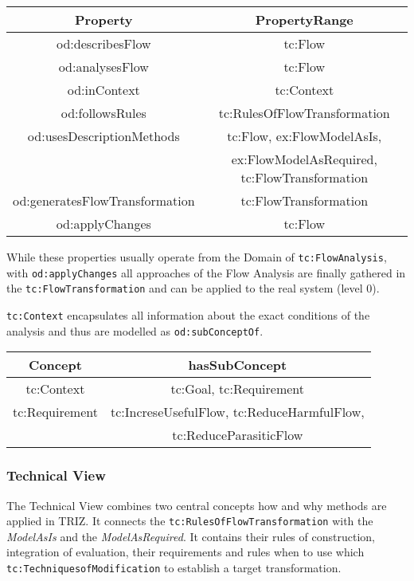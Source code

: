 \documentclass[a4paper,11pt]{article}
\begin{document}
    \begin{center}
        \begin{tabular}{|c|c|}\hline
            Property & PropertyRange \\\hline
            od:describesFlow & tc:Flow \\
            od:analysesFlow & tc:Flow \\
            od:inContext & tc:Context \\
            od:followsRules & tc:RulesOfFlowTransformation \\
            od:usesDescriptionMethods & tc:Flow, ex:FlowModelAsIs, \\
            & ex:FlowModelAsRequired, tc:FlowTransformation \\
            od:generatesFlowTransformation & tc:FlowTransformation \\
            od:applyChanges & tc:Flow \\\hline 
        \end{tabular}
        \end{center}
    
    While these properties usually operate from the Domain of 
    \texttt{tc:FlowAnalysis}, with \newline
    \texttt{od:applyChanges} all approaches of the Flow Analysis are finally
    gathered in the \newline \texttt{tc:FlowTransformation} and can be applied 
    to the real system (level 0).

    \texttt{tc:Context} encapsulates all information about the exact conditions
    of the analysis and \newline thus are modelled as \texttt{od:subConceptOf}.

    \begin{center}
        \begin{tabular}{|c|c|}\hline
            Concept & hasSubConcept \\\hline
            tc:Context & tc:Goal, tc:Requirement \\
            tc:Requirement & tc:IncreseUsefulFlow, tc:ReduceHarmfulFlow, \\
            & tc:ReduceParasiticFlow \\\hline 
        \end{tabular}
        \end{center}

    \subsubsection{Technical View}
    The Technical View combines two central concepts how and why methods are applied
    in TRIZ. It connects the \texttt{tc:RulesOfFlowTransformation} with the 
    \emph{ModelAsIs} and the \emph{ModelAsRequired}. It contains their rules of 
    construction, integration of evaluation, their requirements and rules when to use
    which \texttt{tc:TechniquesofModification} to establish a target transformation. 
\end{document}
